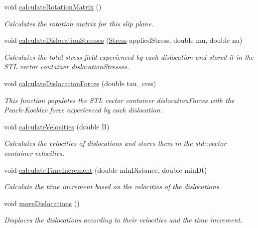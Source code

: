 \begin{DoxyCompactItemize}
void \hyperlink{classSlipPlane_a5d9054f21be225f50860ad1351e3a86f}{calculate\-Rotation\-Matrix} ()
\begin{DoxyCompactList}\small\item\em Calculates the rotation matrix for this slip plane. \end{DoxyCompactList}\item 
void \hyperlink{classSlipPlane_a2d4d2d031502d4a6f0aebbad0990b882}{calculate\-Dislocation\-Stresses} (\hyperlink{classStress}{Stress} applied\-Stress, double mu, double nu)
\begin{DoxyCompactList}\small\item\em Calculates the total stress field experienced by each dislocation and stored it in the S\-T\-L vector container dislocation\-Stresses. \end{DoxyCompactList}\item 
void \hyperlink{classSlipPlane_ac16d1abbbc3b938b6f1f29a33a70212d}{calculate\-Dislocation\-Forces} (double tau\-\_\-crss)
\begin{DoxyCompactList}\small\item\em This function populates the S\-T\-L vector container dislocation\-Forces with the Peach-\/\-Koehler force experienced by each dislocation. \end{DoxyCompactList}\item 
void \hyperlink{classSlipPlane_aff7af69ba5235da6c8b142193509683c}{calculate\-Velocities} (double B)
\begin{DoxyCompactList}\small\item\em Calculates the velocities of dislocations and stores them in the std\-::vector container velocities. \end{DoxyCompactList}\item 
void \hyperlink{classSlipPlane_a5418245f8c716d4a35405d68db53bc66}{calculate\-Time\-Increment} (double min\-Distance, double min\-Dt)
\begin{DoxyCompactList}\small\item\em Calculate the time increment based on the velocities of the dislocations. \end{DoxyCompactList}\item 
void \hyperlink{classSlipPlane_a02482abbb9b9db28a9bb19e6a1c181b5}{move\-Dislocations} ()
\begin{DoxyCompactList}\small\item\em Displaces the dislocations according to their velocities and the time increment. \end{DoxyCompactList}\item 

\end{DoxyCompactItemize}
